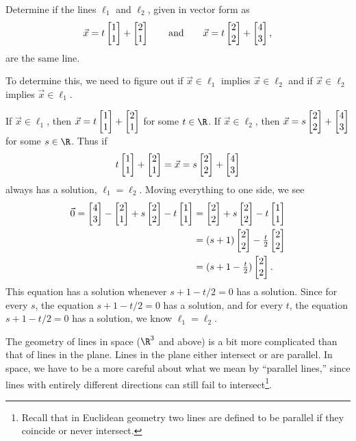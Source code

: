 \begin{example}
	Determine if the lines $\ell_1$ and $\ell_2$, given in vector form as 
	\[
		\vec x=t\mat{1\\1}+\mat{2\\1}\qquad\text{and}\qquad
		\vec x=t\mat{2\\2}+\mat{4\\3},
	\]
	are the same line.  
	
	To determine this, we need to figure out if $\vec x\in\ell_1$
	implies $\vec x\in \ell_2$ and if $\vec x\in\ell_2$ implies $\vec x\in\ell_1$.

	If $\vec x\in\ell_1$, then $\vec x=t\mat{1\\1}+\mat{2\\1}$ for some $t\in\R$.  If
	$\vec x\in\ell_2$, then $\vec x=s\mat{2\\2}+\mat{4\\3}$ for some $s\in \R$.  Thus if
	\[
		t\mat{1\\1}+\mat{2\\1} = \vec x = s\mat{2\\2}+\mat{4\\3}
	\]
	always has a solution, $\ell_1=\ell_2$.  Moving everything to one side, we see
	\begin{align*}
		\vec 0 = \mat{4\\3}-\mat{2\\1} + s\mat{2\\2}-t\mat{1\\1}
		&=\mat{2\\2}+s\mat{2\\2}-t\mat{1\\1}\\
		&=(s+1)\mat{2\\2}-\tfrac{t}{2}\mat{2\\2}\\
		&= (s+1-\tfrac{t}{2})\mat{2\\2}.
	\end{align*}
	This equation has a solution whenever $s+1-t/2=0$ has a solution.  Since for every $s$, the
	equation $s+1-t/2=0$ has a solution, and for every $t$, the equation $s+1-t/2=0$ has a solution,
	we know $\ell_1=\ell_2$.
\end{example}


The geometry of lines in space ($\R^3$ and above) is a bit more complicated than that of lines
in the plane.  Lines in the plane either intersect or are parallel.
In space,  we have to be a more careful about what we mean by
``parallel lines,'' since lines with entirely different directions can
still fail to intersect\footnote{ Recall that in Euclidean geometry
two lines are defined to be parallel if they coincide or never intersect.}.

